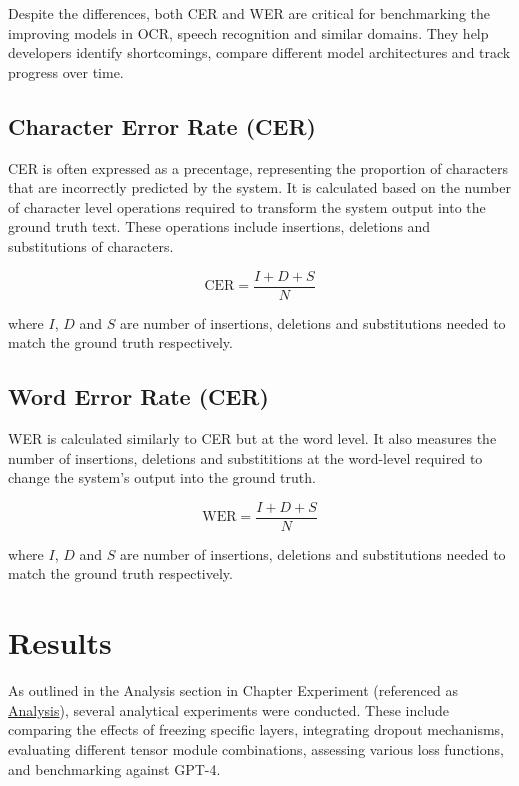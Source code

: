 Despite the differences, both CER and WER are critical for benchmarking the improving models in OCR, speech recognition and similar domains. They help developers identify shortcomings, compare different model architectures and track progress over time.

\subsection{Character Error Rate (CER)}
\label{subsec:5_cer}
CER is often expressed as a precentage, representing the proportion of characters that are incorrectly predicted by the system. It is calculated based on the number of character level operations required to transform the system output into the ground truth text. These operations include insertions, deletions and substitutions of characters.

\begin{equation}
    \text{CER} = \frac{I+D+S}{N}
\end{equation}

where $I$, $D$ and $S$ are number of insertions, deletions and substitutions needed to match the ground truth respectively.

\subsection{Word Error Rate (CER)}
\label{subsec:5_wer}
WER is calculated similarly to CER but at the word level. It also measures the number of insertions, deletions and substititions at the word-level required to change the system's output into the ground truth.

\begin{equation}
    \text{WER} = \frac{I+D+S}{N}
\end{equation}

where $I$, $D$ and $S$ are number of insertions, deletions and substitutions needed to match the ground truth respectively.
\section{Results}
\label{sec:5_results}
As outlined in the Analysis section in Chapter Experiment (referenced as \hyperref[sec:4_analysis]{Analysis}), several analytical experiments were conducted. These include comparing the effects of freezing specific layers, integrating dropout mechanisms, evaluating different tensor module combinations, assessing various loss functions, and benchmarking against GPT-4.
